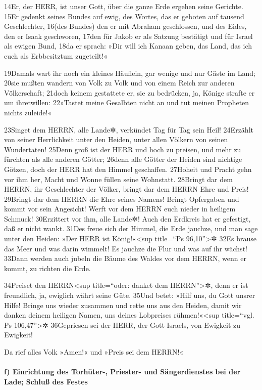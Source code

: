 14Er, der HERR, ist unser Gott, über die ganze Erde ergehen seine
Gerichte. 15Er gedenkt seines Bundes auf ewig, des Wortes, das er
geboten auf tausend Geschlechter, 16(des Bundes) den er mit Abraham
geschlossen, und des Eides, den er Isaak geschworen, 17den für Jakob er
als Satzung bestätigt und für Israel als ewigen Bund, 18da er sprach:
»Dir will ich Kanaan geben, das Land, das ich euch als Erbbesitztum
zugeteilt!«

19Damals wart ihr noch ein kleines Häuflein, gar wenige und nur Gäste im
Land; 20sie mußten wandern von Volk zu Volk und von einem Reich zur
anderen Völkerschaft; 21doch keinem gestattete er, sie zu bedrücken, ja,
Könige strafte er um ihretwillen: 22»Tastet meine Gesalbten nicht an und
tut meinen Propheten nichts zuleide!«

23Singet dem HERRN, alle Lande✲, verkündet Tag für Tag sein Heil!
24Erzählt von seiner Herrlichkeit unter den Heiden, unter allen Völkern
von seinen Wundertaten! 25Denn groß ist der HERR und hoch zu preisen,
und mehr zu fürchten als alle anderen Götter; 26denn alle Götter der
Heiden sind nichtige Götzen, doch der HERR hat den Himmel geschaffen.
27Hoheit und Pracht gehn vor ihm her, Macht und Wonne füllen seine
Wohnstatt. 28Bringt dar dem HERRN, ihr Geschlechter der Völker, bringt
dar dem HERRN Ehre und Preis! 29Bringt dar dem HERRN die Ehre seines
Namens! Bringt Opfergaben und kommt vor sein Angesicht! Werft vor dem
HERRN euch nieder in heiligem Schmuck! 30Erzittert vor ihm, alle Lande✲!
Auch den Erdkreis hat er gefestigt, daß er nicht wankt. 31Des freue sich
der Himmel, die Erde jauchze, und man sage unter den Heiden: »Der HERR
ist König!«\textless sup title=``Ps 96,10''\textgreater✲ 32Es brause das
Meer und was darin wimmelt! Es jauchze die Flur und was auf ihr wächst!
33Dann werden auch jubeln die Bäume des Waldes vor dem HERRN, wenn er
kommt, zu richten die Erde.

34Preiset den HERRN\textless sup title=``oder: danket dem
HERRN''\textgreater✲, denn er ist freundlich, ja, ewiglich währt seine
Güte. 35Und betet: »Hilf uns, du Gott unsrer Hilfe! Bringe uns wieder
zusammen und rette uns aus den Heiden, damit wir danken deinem heiligen
Namen, uns deines Lobpreises rühmen!«\textless sup title=``vgl. Ps
106,47''\textgreater✲ 36Gepriesen sei der HERR, der Gott Israels, von
Ewigkeit zu Ewigkeit!

Da rief alles Volk »Amen!« und »Preis sei dem HERRN!«

\hypertarget{f-einrichtung-des-torhuxfcter--priester--und-suxe4ngerdienstes-bei-der-lade-schluuxdf-des-festes}{%
\paragraph{f) Einrichtung des Torhüter-, Priester- und Sängerdienstes
bei der Lade; Schluß des
Festes}\label{f-einrichtung-des-torhuxfcter--priester--und-suxe4ngerdienstes-bei-der-lade-schluuxdf-des-festes}}

